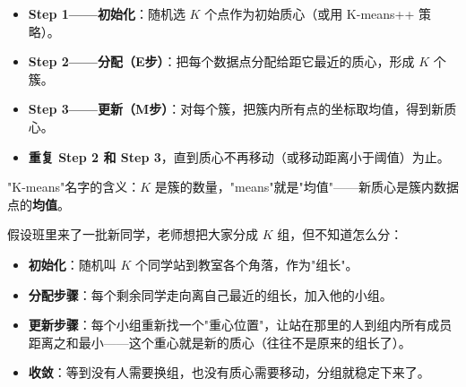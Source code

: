 \documentclass[a4paper,11pt]{ctexart}
\begin{document}
\begin{beginnerbox}
    \begin{itemize}
        \item \textbf{Step 1——初始化}：随机选 $K$ 个点作为初始质心（或用 K-means++ 策略）。
        \item \textbf{Step 2——分配（E步）}：把每个数据点分配给距它最近的质心，形成 $K$ 个簇。
        \item \textbf{Step 3——更新（M步）}：对每个簇，把簇内所有点的坐标取均值，得到新质心。
        \item \textbf{重复 Step 2 和 Step 3}，直到质心不再移动（或移动距离小于阈值）为止。
    \end{itemize}
    "K-means"名字的含义：$K$ 是簇的数量，"means"就是"均值"——新质心是簇内数据点的\textbf{均值}。
\end{beginnerbox}

\begin{metaphorbox}
    假设班里来了一批新同学，老师想把大家分成 $K$ 组，但不知道怎么分：
    \begin{itemize}
        \item \textbf{初始化}：随机叫 $K$ 个同学站到教室各个角落，作为"组长"。
        \item \textbf{分配步骤}：每个剩余同学走向离自己最近的组长，加入他的小组。
        \item \textbf{更新步骤}：每个小组重新找一个"重心位置"，让站在那里的人到组内所有成员距离之和最小——这个重心就是新的质心（往往不是原来的组长了）。
        \item \textbf{收敛}：等到没有人需要换组，也没有质心需要移动，分组就稳定下来了。
    \end{itemize}
\end{metaphorbox}
\end{document}

